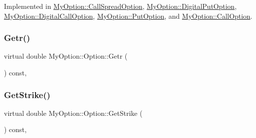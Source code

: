 Implemented in \hyperlink{classMyOption_1_1CallSpreadOption_a2e45ec109e4fd26acc6506caa1952c0c}{My\+Option\+::\+Call\+Spread\+Option}, \hyperlink{classMyOption_1_1DigitalPutOption_abadcbb78c02b4e6ee22d45da1c72f7b1}{My\+Option\+::\+Digital\+Put\+Option}, \hyperlink{classMyOption_1_1DigitalCallOption_a260e5ad85712e35131bf7b583d0c8525}{My\+Option\+::\+Digital\+Call\+Option}, \hyperlink{classMyOption_1_1PutOption_a5f1609850308f1770d9ad6051ec55f12}{My\+Option\+::\+Put\+Option}, and \hyperlink{classMyOption_1_1CallOption_ad1ee991cfd969e450d7d227dee61be05}{My\+Option\+::\+Call\+Option}.

\hypertarget{classMyOption_1_1Option_a4dc076bd6fbc9877aadf1148c42832d2}{}\label{classMyOption_1_1Option_a4dc076bd6fbc9877aadf1148c42832d2} 
\subsubsection{\texorpdfstring{Getr()}{Getr()}}
{\footnotesize\ttfamily virtual double My\+Option\+::\+Option\+::\+Getr (\begin{DoxyParamCaption}{ }\end{DoxyParamCaption}) const\hspace{0.3cm}{\ttfamily [inline]}, {\ttfamily [virtual]}}

\hypertarget{classMyOption_1_1Option_a3ceb4460631f043e5fa8c06f9ee3bde2}{}\label{classMyOption_1_1Option_a3ceb4460631f043e5fa8c06f9ee3bde2} 
\subsubsection{\texorpdfstring{Get\+Strike()}{GetStrike()}}
{\footnotesize\ttfamily virtual double My\+Option\+::\+Option\+::\+Get\+Strike (\begin{DoxyParamCaption}{ }\end{DoxyParamCaption}) const\hspace{0.3cm}{\ttfamily [inline]}, {\ttfamily [virtual]}}

\hypertarget{classMyOption_1_1Option_aff32b402a5e44fca9e5a22a142fbbdd6}{}\label{classMyOption_1_1Option_aff32b402a5e44fca9e5a22a142fbbdd6} 
